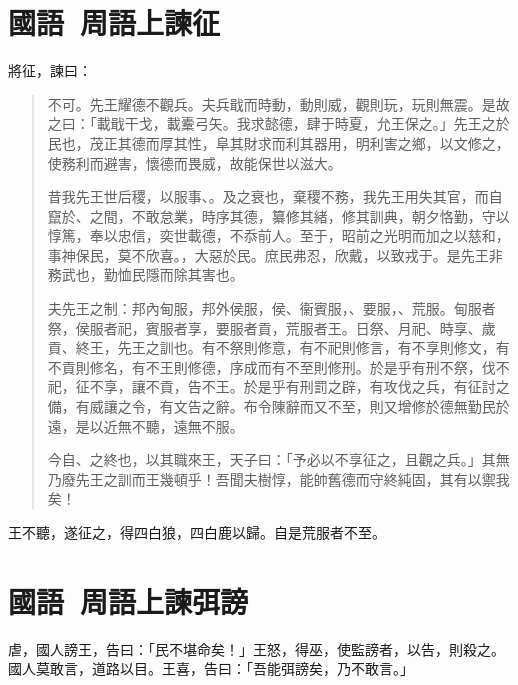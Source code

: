 \section[祭公諫征犬戎\quad{\small 國語 周語上}]{{\normalsize 國語\ 周語上}\quad {}諫征}
將征，諫曰：

\begin{quotation}
不可。先王耀德不觀兵。夫兵戢而時動，動則威，觀則玩，玩則無震。是故之曰：「載戢干戈，載櫜弓矢。我求懿德，肆于時夏，允王保之。」先王之於民也，{茂}正其德而厚其性，阜其財求而利其器用，明利害之鄉，以文修之，使務利而避害，懷德而畏威，故能保世以滋大。

昔我先王世后稷，以服事、。及之衰也，棄稷不務，我先王用失其官，而自竄於、之間，不敢怠業，時序其德，纂修其緒，修其訓典，朝夕恪勤，守以{惇}篤，奉以忠信，奕世載德，不忝前人。至于，昭前之光明而加之以慈和，事神保民，莫不欣喜。，大惡於民。庶民弗忍，欣戴，以致戎于。是先王非務武也，勤恤民隱而除其害也。

夫先王之制：邦內甸服，邦外侯服，侯、衞賓服，、要服，、荒服。甸服者祭，侯服者祀，賓服者享，要服者貢，荒服者王。日祭、月祀、時享、歲貢、終王，先王之訓也。有不祭則修意，有不祀則修言，有不享則修文，有不貢則修名，有不王則修德，序成而有不至則修刑。於是乎有刑不祭，伐不祀，征不享，讓不貢，告不王。於是乎有刑罰之辟，有攻伐之兵，有征討之備，有威讓之令，有文告之辭。布令陳辭而又不至，則又增修於德無勤民於遠，是以近無不聽，遠無不服。

今自、之終也，以其職來王，天子曰：「予必以不享征之，且觀之兵。」其無乃廢先王之訓而王幾頓乎！吾聞夫樹惇，能帥舊德而守終純固，其有以禦我矣！
\end{quotation}

王不聽，遂征之，得四白狼，四白鹿以歸。自是荒服者不至。

\section[召公諫厲王弭謗\quad{\small 國語 周語上}]{{\normalsize 國語\ 周語上}\quad {}諫弭謗}
虐，國人謗王，告曰：「民不堪命矣！」王怒，得巫，使監謗者，以告，則殺之。國人莫敢言，道路以目。王喜，告曰：「吾能弭謗矣，乃不敢言。」

